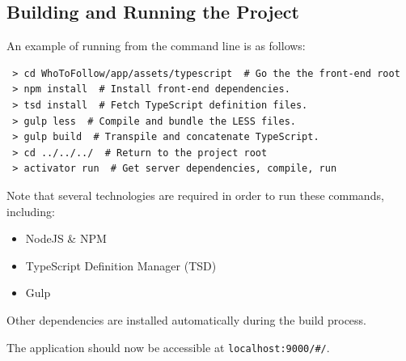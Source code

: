 \documentclass{l4proj}
\newcommand{\code}[1]{\texttt{#1}}
\begin{document}
\begin{appendices}

\chapter{Building and Running the Project}
An example of running from the command line is as follows:
\begin{verbatim}
 > cd WhoToFollow/app/assets/typescript  # Go the the front-end root
 > npm install  # Install front-end dependencies. 
 > tsd install  # Fetch TypeScript definition files. 
 > gulp less  # Compile and bundle the LESS files. 
 > gulp build  # Transpile and concatenate TypeScript. 
 > cd ../../../  # Return to the project root 
 > activator run  # Get server dependencies, compile, run
\end{verbatim}

Note that several technologies are required in order to run these commands, including:

\begin{itemize}
\item NodeJS \& NPM
\item TypeScript Definition Manager (TSD)
\item Gulp
\end{itemize}

Other dependencies are installed automatically during the build process.

The application should now be accessible at \code{localhost:9000/\#/}.

\end{appendices}




\end{document}
